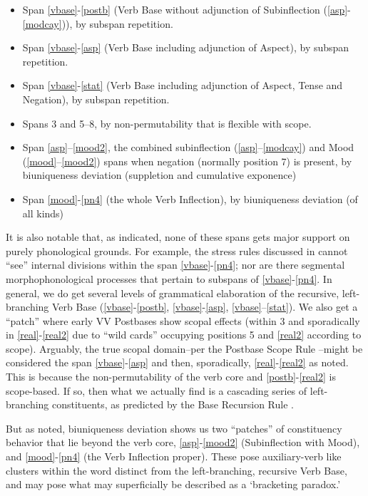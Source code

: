 \documentclass[output=paper]{langscibook}
\begin{document}
\begin{itemize}
\item 
 Span \ref{vbase}-\ref{postb} (Verb Base without adjunction of Subinflection (\ref{asp}-\ref{modcay})), by subspan repetition.
\item 
Span \ref{vbase}-\ref{asp} (Verb Base including adjunction of Aspect), by subspan repetition.
\item 
Span \ref{vbase}-\ref{stat} (Verb Base including adjunction of Aspect, Tense and Negation), by subspan repetition.
\item 
Spans 3 and 5--8, by non-permutability that is flexible with scope.
\item 
Span \ref{asp}--\ref{mood2}, the combined subinflection (\ref{asp}--\ref{modcay}) and Mood (\ref{mood}--\ref{mood2}) spans when negation (normally position 7) is present, by biuniqueness deviation (suppletion and cumulative exponence)
\item 
Span \ref{mood}-\ref{pn4} (the whole Verb Inflection), by biuniqueness deviation (of all kinds)
\end{itemize}

It is also notable that, as indicated, none of these spans gets major support on purely phonological grounds. For example, the stress rules discussed in  cannot “see” internal divisions within the span \ref{vbase}-\ref{pn4}; nor are there segmental morphophonological processes that pertain to subspans of \ref{vbase}-\ref{pn4}. In general, we do get several levels of grammatical elaboration of the recursive, left-branching Verb Base (\ref{vbase}-\ref{postb}, \ref{vbase}-\ref{asp}, \ref{vbase}--\ref{stat}). We also get a “patch” where early VV Postbases show scopal effects (within 3 and sporadically in \ref{real}-\ref{real2} due to ``wild cards'' occupying positions 5 and \ref{real2} according to scope). Arguably, the true scopal domain--per the Postbase Scope Rule --might be considered the span \ref{vbase}-\ref{asp} and then, sporadically, \ref{real}-\ref{real2} as noted. This is because the non-permutability of the verb core and \ref{postb}-\ref{real2} is scope-based. If so, then what we actually find is a cascading series of left-branching constituents, as predicted by the Base Recursion Rule .

But as noted, biuniqueness deviation shows us two “patches” of constituency behavior that lie beyond the verb core, \ref{asp}-\ref{mood2} (Subinflection with Mood), and \ref{mood}-\ref{pn4} (the Verb Inflection proper). These pose auxiliary-verb like clusters within the word distinct from the left-branching, recursive Verb Base, and may pose what may superficially be described as a `bracketing paradox.'
\end{document}
